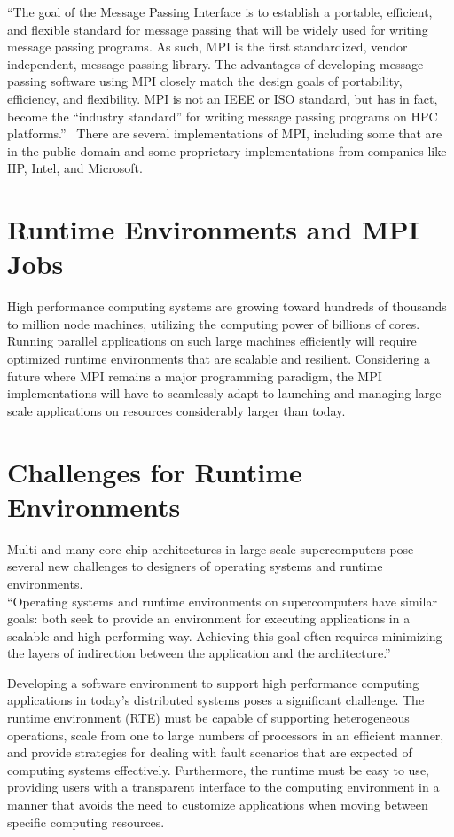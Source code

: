 ``The goal of the Message Passing Interface is to establish a portable, efficient, and flexible standard for message passing that will be widely used for writing message passing programs. As such, MPI is the first standardized, vendor independent, message passing library. The advantages of developing message passing software using MPI closely match the design goals of portability, efficiency, and flexibility. MPI is not an IEEE or ISO standard, but has in fact, become the ``industry standard'' for writing message passing programs on HPC platforms.''~\cite{barker2015message} There are several implementations of MPI, including some that are in the public domain and some proprietary implementations from companies like HP, Intel, and Microsoft.


\section{Runtime Environments and MPI Jobs}
High performance computing systems are growing toward hundreds of thousands to million node machines, utilizing the computing power of billions of cores. Running parallel applications on such large machines efficiently will require optimized runtime environments that are scalable and resilient. Considering a future where MPI remains a major programming paradigm, the MPI implementations will have to seamlessly adapt to launching and managing large scale applications on resources considerably larger than today.~\cite{bosilca2011scalability}

\section{Challenges for Runtime Environments}
Multi and many core chip architectures in large scale supercomputers pose several new challenges to designers of operating systems and runtime environments.\\
``Operating systems and runtime environments on supercomputers have similar goals: both seek to provide an environment for executing applications in a scalable and high-performing way. Achieving this goal often requires minimizing the layers of indirection between the application and the architecture.''~\cite{Hoefler:2012:OSR:2237840.2237848}

Developing a software environment to support high performance computing applications in today's distributed systems poses a significant challenge. The runtime environment (RTE) must be capable of supporting heterogeneous operations, scale from one to large numbers of processors in an efficient manner, and provide strategies for dealing with fault scenarios that are expected of computing systems effectively. Furthermore, the runtime must be easy to use, providing users with a transparent interface to the computing environment in a manner that avoids the need to customize applications when moving between specific computing resources.~\cite{Castain2008153}

